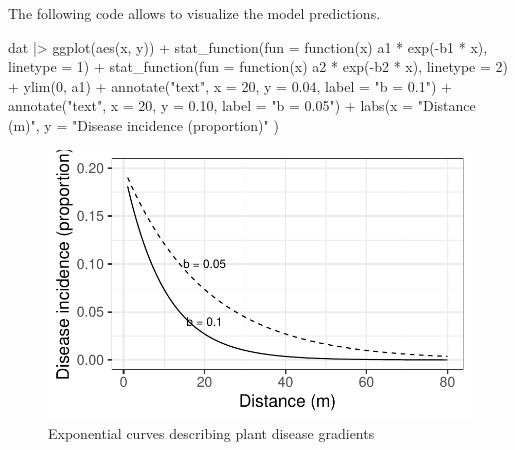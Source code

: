 \documentclass[
  letterpaper,
  DIV=11,
  numbers=noendperiod]{scrreprt}
\newenvironment{Shaded}{\begin{snugshade}}{\end{snugshade}}
\newcommand{\AttributeTok}[1]{\textcolor[rgb]{0.40,0.45,0.13}{#1}}
\newcommand{\ControlFlowTok}[1]{\textcolor[rgb]{0.00,0.23,0.31}{#1}}
\newcommand{\DecValTok}[1]{\textcolor[rgb]{0.68,0.00,0.00}{#1}}
\newcommand{\FloatTok}[1]{\textcolor[rgb]{0.68,0.00,0.00}{#1}}
\newcommand{\FunctionTok}[1]{\textcolor[rgb]{0.28,0.35,0.67}{#1}}
\newcommand{\NormalTok}[1]{\textcolor[rgb]{0.00,0.23,0.31}{#1}}
\newcommand{\SpecialCharTok}[1]{\textcolor[rgb]{0.37,0.37,0.37}{#1}}
\newcommand{\StringTok}[1]{\textcolor[rgb]{0.13,0.47,0.30}{#1}}
\begin{document}
The following code allows to visualize the model predictions.

\begin{Shaded}
\begin{Highlighting}[]
\NormalTok{dat }\SpecialCharTok{|\textgreater{}}
  \FunctionTok{ggplot}\NormalTok{(}\FunctionTok{aes}\NormalTok{(x, y)) }\SpecialCharTok{+}
  \FunctionTok{stat\_function}\NormalTok{(}\AttributeTok{fun =} \ControlFlowTok{function}\NormalTok{(x) a1 }\SpecialCharTok{*} \FunctionTok{exp}\NormalTok{(}\SpecialCharTok{{-}}\NormalTok{b1 }\SpecialCharTok{*}\NormalTok{ x), }\AttributeTok{linetype =} \DecValTok{1}\NormalTok{) }\SpecialCharTok{+}
  \FunctionTok{stat\_function}\NormalTok{(}\AttributeTok{fun =} \ControlFlowTok{function}\NormalTok{(x) a2 }\SpecialCharTok{*} \FunctionTok{exp}\NormalTok{(}\SpecialCharTok{{-}}\NormalTok{b2 }\SpecialCharTok{*}\NormalTok{ x), }\AttributeTok{linetype =} \DecValTok{2}\NormalTok{) }\SpecialCharTok{+}
  \FunctionTok{ylim}\NormalTok{(}\DecValTok{0}\NormalTok{, a1) }\SpecialCharTok{+}
  \FunctionTok{annotate}\NormalTok{(}\StringTok{"text"}\NormalTok{, }\AttributeTok{x =} \DecValTok{20}\NormalTok{, }\AttributeTok{y =} \FloatTok{0.04}\NormalTok{, }\AttributeTok{label =} \StringTok{"b = 0.1"}\NormalTok{) }\SpecialCharTok{+}
  \FunctionTok{annotate}\NormalTok{(}\StringTok{"text"}\NormalTok{, }\AttributeTok{x =} \DecValTok{20}\NormalTok{, }\AttributeTok{y =} \FloatTok{0.10}\NormalTok{, }\AttributeTok{label =} \StringTok{"b = 0.05"}\NormalTok{) }\SpecialCharTok{+}
  \FunctionTok{labs}\NormalTok{(}\AttributeTok{x =} \StringTok{"Distance (m)"}\NormalTok{, }\AttributeTok{y =} \StringTok{"Disease incidence (proportion)"}
\NormalTok{  )}
\end{Highlighting}
\end{Shaded}

\begin{figure}[H]

{\centering \includegraphics{spatial-models_files/figure-pdf/fig-exp1-1.pdf}

}

\caption{\label{fig-exp1}Exponential curves describing plant disease
gradients}

\end{figure}
\end{document}
